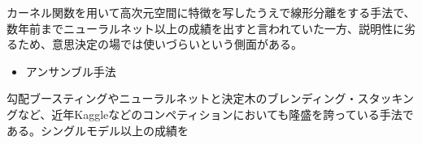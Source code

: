 \documentclass[11pt]{jsarticle}
\providecommand{\tightlist}{%
      \setlength{\itemsep}{0pt}\setlength{\parskip}{0pt}}
\begin{document}
カーネル関数を用いて高次元空間に特徴を写したうえで線形分離をする手法で、数年前までニューラルネット以上の成績を出すと言われていた一方、説明性に劣るため、意思決定の場では使いづらいという側面がある。

\begin{itemize}
\tightlist
\item
  アンサンブル手法
\end{itemize}

勾配ブースティングやニューラルネットと決定木のブレンディング・スタッキングなど、近年Kaggleなどのコンペティションにおいても隆盛を誇っている手法である。シングルモデル以上の成績を


    
    
    
    
\end{document}
